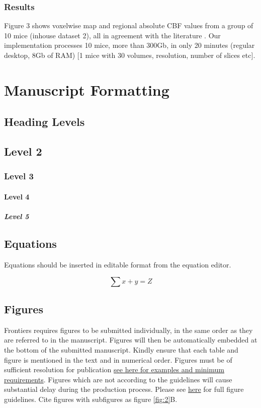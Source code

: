 \documentclass[utf8]{frontiersSCNS} %
\begin{document}
\subsubsection{Results}
%
Figure 3 shows voxelwise map and regional absolute CBF values from a group of 10 mice (inhouse dataset 2), all 
in agreement with the literature \citep{muir2008cerebral}. Our implementation processes 10 mice, more than 
300Gb, in only 20 minutes (regular desktop, 8Gb of RAM) [1 mice with 30 volumes, resolution, number of slices 
etc].

\section{Manuscript Formatting}

\subsection{Heading Levels}


\subsection{Level 2}
\subsubsection{Level 3}
\paragraph{Level 4}
\subparagraph{Level 5}

\subsection{Equations}
Equations should be inserted in editable format from the equation editor.

\begin{equation}
\sum x+ y =Z\label{eq:01}
\end{equation}

\subsection{Figures}
Frontiers requires figures to be submitted individually, in the same order as they are referred to in the manuscript. Figures will then be automatically embedded at the bottom of the submitted manuscript. Kindly ensure that each table and figure is mentioned in the text and in numerical order. Figures must be of sufficient resolution for publication \href{http://home.frontiersin.org/about/author-guidelines#ResolutionRequirements}{see here for examples and minimum requirements}. Figures which are not according to the guidelines will cause substantial delay during the production process. Please see \href{http://home.frontiersin.org/about/author-guidelines#GeneralStyleGuidelinesforFigures}{here} for full figure guidelines. Cite figures with subfigures as figure \ref{fig:2}B.
\end{document}
